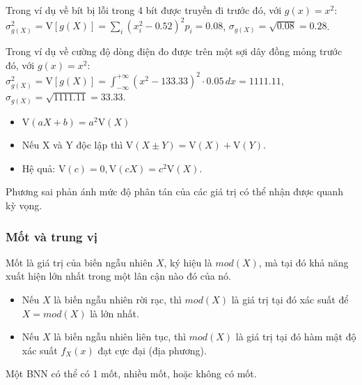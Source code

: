 \documentclass[12pt,a4paper]{article}
\begin{document}
\begin{vidu}
Trong ví dụ về bít bị lỗi trong 4 bít được truyền đi trước đó, với $g(x) = x^2$: $\sigma_{g(X)}^2 = \mathrm{V}[g(X)] = \displaystyle\sum_i (x_i^2 - 0.52)^2 p_i = 0.08$, $\sigma_{g(X)} = \sqrt{0.08} = 0.28$.

Trong ví dụ về cường độ dòng điện đo được trên một sợi dây đồng mỏng trước đó, với $g(x) = x^2$: $\sigma_{g(X)}^2 = \mathrm{V}[g(X)] = \displaystyle\int_{-\infty}^{+\infty} (x^2 - 133.33)^2 \cdot 0.05\,dx = 1111.11$, $\sigma_{g(X)} = \sqrt{1111.11} = 33.33$.
\end{vidu}

\begin{tinhchat}[title={Tính chất phương sai}]
  \begin{itemize}
  \item $\mathrm{V}(aX + b) = a^2 \mathrm{V}(X)$
  \item Nếu X và Y độc lập thì $\mathrm{V}(X \pm Y) = \mathrm{V}(X) + \mathrm{V}(Y)$.
  \item Hệ quả: $\mathrm{V}(c) = 0, \mathrm{V}(cX) = c^2 \mathrm{V}(X)$.
  \end{itemize}
\end{tinhchat}

\begin{ynghia}
  Phương sai phản ánh mức độ phân tán của các giá trị có thể nhận được quanh kỳ vọng.
\end{ynghia}

\subsubsection{Mốt và trung vị}

\begin{dinhnghia}[title={Mốt}]
  Mốt là giá trị của biến ngẫu nhiên $X$, ký hiệu là $mod(X)$, mà tại đó khả năng xuất hiện lớn nhất trong một lân cận nào đó của nó.
  \begin{itemize}
    \item Nếu $X$ là biến ngẫu nhiên rời rạc, thì $mod(X)$ là giá trị tại đó xác suất để $X = mod(X)$ là lớn nhất.
    \item Nếu $X$ là biến ngẫu nhiên liên tục, thì $mod(X)$ là giá trị tại đó hàm mật độ xác suất $f_X(x)$ đạt cực đại (địa phương).
  \end{itemize}
\end{dinhnghia}

\begin{luuy}
Một BNN có thể có 1 mốt, nhiều mốt, hoặc không có mốt.
\end{luuy}
\end{document}
